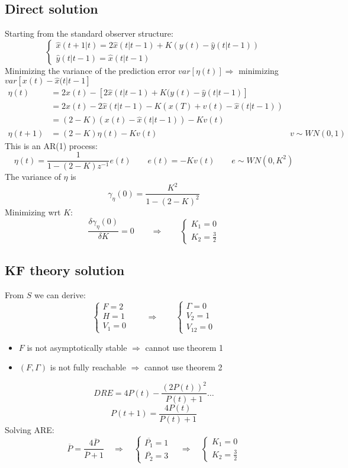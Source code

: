 \documentclass{article}
\begin{document}
\subsection{Direct solution}
Starting from the standard observer structure:
\[
\begin{cases}
\hat{x}(t+1|t)=2\hat{x}(t|t-1)+K(y(t)-\hat{y}(t|t-1))\\
\hat{y}(t|t-1)=\hat{x}(t|t-1)
\end{cases}
\]
Minimizing the variance of the prediction error $var[\eta(t)]\Rightarrow$ minimizing $var[x(t)-\hat{x}(t|t-1]$
\begin{align*}
\eta(t)&=
2x(t)-[2\hat{x}(t|t-1)+K(y(t)-\hat{y}(t|t-1)]\\
&=2x(t)-2\hat{x}(t|t-1)-K(x(T)+v(t)-\hat{x}(t|t-1))\\
&=(2-K)(x(t)-\hat{x}(t|t-1))-Kv(t)\\
\eta(t+1)&=(2-K)\eta(t)-Kv(t)&v\sim WN(0,1)
\end{align*}
This is an AR(1) process:
\[
\eta(t)=\frac{1}{
1-(2-K)z^{-1}
}e(t)
\qquad
e(t)=-Kv(t)
\qquad
e\sim WN(0,K^2)
\]
The variance of $\eta$ is
\[
\gamma_\eta(0)=\frac{K^2}{1-(2-K)^2}
\]
Minimizing wrt $K$:
\[
\frac{\delta \gamma_\eta(0)}{\delta K}=0
\qquad\Rightarrow\qquad
\begin{cases}
K_1=0\\
K_2=\frac{3}{2}
\end{cases}
\]
\subsection{KF theory solution}
From $S$ we can derive:
\[
\begin{cases}
F=2\\H=1\\V_1=0
\end{cases}
\qquad\Rightarrow\qquad
\begin{cases}
\Gamma=0\\V_2=1\\V_{12}=0
\end{cases}
\]
\begin{itemize}
\item $F$ is not asymptotically stable $\Rightarrow$ cannot use theorem 1
\item $(F,\Gamma)$ is not fully reachable $\Rightarrow$ cannot use theorem 2
\end{itemize}
\[
DRE=4P(t)-\frac{(2P(t))^2}{P(t)+1}\dots
\]
\[
P(t+1)=\frac{4P(t)}{P(t)+1}
\]
Solving ARE:
\[
\overline{P}=\frac{4\overline{P}}{\overline{P}+1}
\quad\Rightarrow\quad
\begin{cases}
\overline{P_1}=1\\
\overline{P_2}=3
\end{cases}
\quad\Rightarrow\quad
\begin{cases}
K_1=0\\
K_2=\frac{3}{2}
\end{cases}
\]
\end{document}
